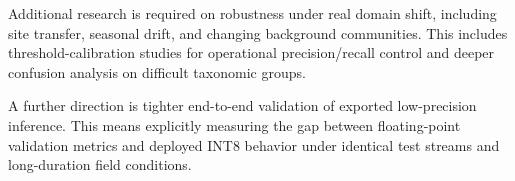 \documentclass[a4paper,singleside,12pt]{report} %
\begin{document}
		\begin{sloppypar}
		Additional research is required on robustness under real domain shift, including site transfer, seasonal drift, and changing background communities. This includes threshold-calibration studies for operational precision/recall control and deeper confusion analysis on difficult taxonomic groups.
		\end{sloppypar}

		\begin{sloppypar}
		A further direction is tighter end-to-end validation of exported low-precision inference. This means explicitly measuring the gap between floating-point validation metrics and deployed INT8 behavior under identical test streams and long-duration field conditions.
		\end{sloppypar}

		{\sloppy\printbibliography[heading=bibintoc]} %

	

	
\end{document}
